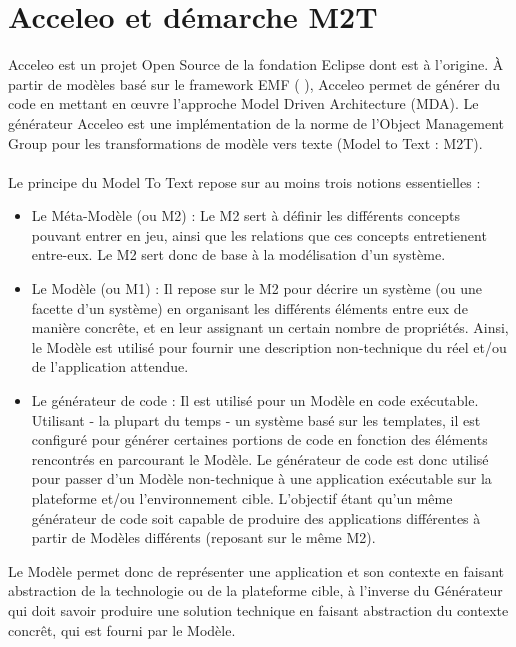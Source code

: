 \section{Acceleo et démarche M2T}
Acceleo est un projet Open Source de la fondation Eclipse dont \kwobeo{} est à l'origine. À partir de modèles basé sur le framework EMF (\cf{} \cite{emf}), Acceleo permet de générer du code en mettant en œuvre l'approche Model Driven Architecture (MDA). Le générateur Acceleo est une implémentation de la norme de l'Object Management Group \cite{omg} pour les transformations de modèle vers texte (Model to Text : M2T).
\\\\
Le principe du Model To Text repose sur au moins trois notions essentielles :
\begin{itemize}
\item Le Méta-Modèle (ou M2) : Le M2 sert à définir les différents concepts pouvant entrer en jeu, ainsi que les relations que ces concepts entretienent entre-eux. Le M2 sert donc de base à la modélisation d'un système.
\item Le Modèle (ou M1) : Il repose sur le M2 pour décrire un système (ou une facette d'un système) en organisant les différents éléments entre eux de manière concrête, et en leur assignant un certain nombre de propriétés. Ainsi, le Modèle est utilisé pour fournir une description non-technique du réel et/ou de l'application attendue.
\item Le générateur de code : Il est utilisé pour  un Modèle en code exécutable. Utilisant - la plupart du temps - un système basé sur les templates, il est configuré pour générer certaines portions de code en fonction des éléments rencontrés en parcourant le Modèle. Le générateur de code est donc utilisé pour passer d'un Modèle non-technique à une application exécutable sur la plateforme et/ou l'environnement cible. L'objectif étant qu'un même générateur de code soit capable de produire des applications différentes à partir de Modèles différents (reposant sur le même M2).\\
\end{itemize}

Le Modèle permet donc de représenter une application et son contexte en faisant abstraction de la technologie ou de la plateforme cible, à l'inverse du Générateur qui doit savoir produire une solution technique en faisant abstraction du contexte concrêt, qui est fourni par le Modèle.




